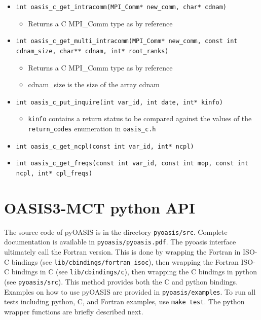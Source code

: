\begin{itemize}
\vspace{0.2cm}
\item {\tt int oasis\_c\_get\_intracomm(MPI\_Comm* new\_comm, char* cdnam)}
  \begin{itemize}
  \item Returns a C MPI\_Comm type as by reference
  \end{itemize}

\vspace{0.2cm}
\item {\tt int oasis\_c\_get\_multi\_intracomm(MPI\_Comm* new\_comm, const int cdnam\_size, char** cdnam, int* root\_ranks)}
  \begin{itemize}
  \item Returns a C MPI\_Comm type as by reference
  \item cdnam\_size is the size of the array cdnam
  \end{itemize}

\vspace{0.2cm}
\item {\tt int oasis\_c\_put\_inquire(int var\_id, int date, int* kinfo)}
  \begin{itemize}
  \item {\tt kinfo} contains a return status to be compared against
    the values of the {\tt return\_codes} enumeration in {\tt oasis\_c.h}
  \end{itemize}

\vspace{0.2cm}
\item {\tt int oasis\_c\_get\_ncpl(const int var\_id, int* ncpl)}

\vspace{0.2cm}
\item {\tt int oasis\_c\_get\_freqs(const int var\_id, const int mop, const int ncpl, int*  cpl\_freqs)}

\end{itemize}

\section{OASIS3-MCT python API}
\label{APIpython}

The source code of pyOASIS is in the directory  {\tt pyoasis/src}. Complete
documentation is available in  {\tt pyoasis/pyoasis.pdf}. The pyoasis interface
ultimately call the Fortran version.  This is done by wrapping the
Fortran in ISO-C bindings (see  {\tt lib/cbindings/fortran\_isoc}), then
wrapping the Fortran ISO-C bindings in C (see  {\tt lib/cbindings/c}), then
wrapping the C bindings in python (see  {\tt pyoasis/src}).  This method
provides both the C and python bindings.  Examples on how
to use pyOASIS are provided in  {\tt pyoasis/examples}. To run all tests including python, C, and
Fortran examples, use {\tt make test}. The python wrapper functions
are briefly described next.

